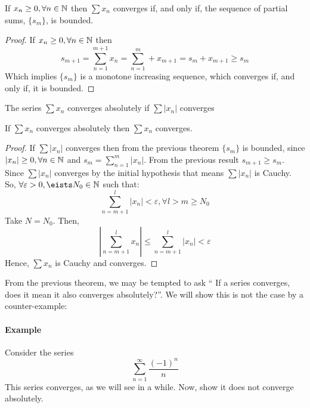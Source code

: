 \begin{theorem}
    If $x_n \geq 0, \forall n \in \mathbb{N}$ then $\sum x_n$ converges if, and only if, the sequence of partial sums, $\{s_m\}$, is bounded.
\end{theorem}

\begin{proof}
    If $x_n \geq 0, \forall n \in \mathbb{N}$ then
    \begin{equation*}
        s_{m+1} = \sum \limits_{n=1}^{m+1} x_n = \sum \limits_{n=1}^m + x_{m+1} = s_m + x_{m+1} \geq s_m
    \end{equation*}
    Which implies $\{s_m\}$ is a monotone increasing sequence, which converges if, and only if, it is bounded.
\end{proof}

\begin{definition}
    The series $\sum x_n$ converges absolutely if $\sum |x_n|$ converges
\end{definition}

\begin{theorem}
    If $\sum x_n$ converges absolutely then $\sum x_n$ converges.
\end{theorem}

\begin{proof}
    If $\sum |x_n|$ converges then from the previous theorem $\{s_m\}$ is bounded, since $|x_n| \geq 0, \forall n \in \mathbb{N}$ and $s_m = \sum_{n=1}^m |x_n|$. From the previous result $s_{m+1} \geq s_m$. Since $\sum |x_n|$ converges by the initial hypothesis that means $\sum |x_n|$ is Cauchy. So, $\forall \varepsilon > 0, \eists N_0 \in \N$ such that:
    \begin{equation*}
        \sum \limits_{n=m+1}^l |x_n| < \varepsilon, \forall l > m \geq N_0
    \end{equation*}
    Take $N = N_0$. Then, 
    \begin{equation*}
        \left |
            \sum \limits_{n=m+1}^l x_n
        \right | \leq
        \sum \limits_{n=m+1}^l |x_n|
        < \varepsilon
    \end{equation*}
    Hence, $\sum x_n$ is Cauchy and converges.
\end{proof}

From the previous theorem, we may be tempted to ask `` If a series converges, does it mean it also converges absolutely?''. We will show this is not the case by a counter-example:
\paragraph{Example} Consider the series
\begin{equation*}
    \sum \limits_{n=1}^\infty \frac{(-1)^n}{n}
\end{equation*}
This series converges, as we will see in a while. Now, show it does not converge absolutely.


